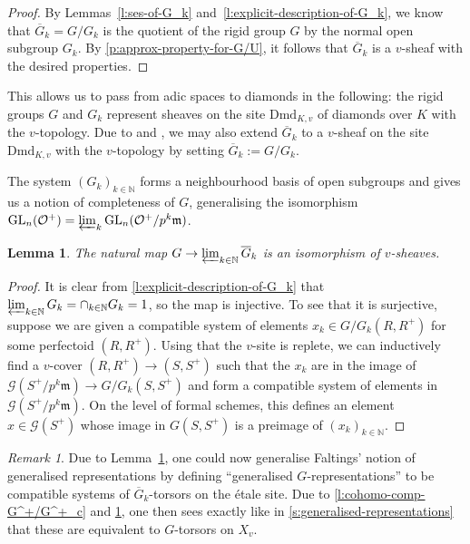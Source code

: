 \documentclass[10pt,a4paper]{article}
\newtheorem{Lemma}[thm]{Lemma}
\theoremstyle{definition}
\theoremstyle{remark}
\newtheorem{Remark}[thm]{Remark}
\newcommand{\N}{\mathbb{N}}
\renewcommand{\O}{\mathcal{O}}
\newcommand{\m}{\mathfrak{m}}
\newcommand{\GL}{\operatorname{GL}}
\newcommand{\mG}{\mathcal{G}}
\newcommand{\Dmd}{\mathrm{Dmd}}
\numberwithin{equation}{section}
\begin{document}
\begin{proof}
	By Lemmas~\ref{l:ses-of-G_k} and~\ref{l:explicit-description-of-G_k}, we know that $\overline G_k=G/G_k$ is the quotient of the rigid group $G$ by the normal open subgroup $G_k$. By \cref{p:approx-property-for-G/U}, it follows that $\overline G_k$ is a $v$-sheaf with the desired properties.
\end{proof}

This allows us to pass from adic spaces to diamonds in the following: the rigid groups $G$ and $G_k$ represent sheaves on the site $\Dmd_{K,v}$ of diamonds over $K$ with the $v$-topology.
Due to  and , we may also extend $\overline{G}_k$ to a $v$-sheaf on the site $\Dmd_{K,v}$ with the $v$-topology by setting $\overline{G}_k:=G/G_k$.

The system $(G_k)_{k\in \N}$ forms a neighbourhood basis of  open subgroups and gives us a notion of completeness of $G$, generalising the isomorphism $\GL_n(\O^+)=\varprojlim_k \GL_n(\O^+/p^k\m)$. 

\begin{Lemma}\label{l:G^+-complete}
	The natural map $ G\to\varprojlim_{k\in \N} \overline{G}_{k}$
	is an isomorphism of $v$-sheaves.
\end{Lemma}

\begin{proof}
	It is clear from \cref{l:explicit-description-of-G_k} that $\varprojlim_{k\in \N} G_k=\cap_{k\in \N} G_k=1$, so the map is injective. To see that it is surjective, suppose we are given a compatible system of elements $x_k\in G/G_k(R,R^+)$ for some perfectoid $(R,R^+)$. Using that the $v$-site is replete, we can inductively find a $v$-cover $(R,R^+)\to (S,S^+)$ such that the $x_k$ are in the image of $\mG(S^+/p^k\m)\to G/G_k(S,S^+)$ and form a compatible system of elements in $\mG(S^+/p^k\m)$. On the level of formal schemes, this defines an element $x\in\mG(S^+)$ whose image in $G(S,S^+)$ is a preimage of $(x_k)_{k\in \N}$.
\end{proof}

\begin{Remark}
	Due to Lemma~\ref{l:G^+-complete}, one could now generalise Faltings' notion of generalised representations by defining ``generalised $G$-representations'' to be compatible systems of $\overline G_{k}$-torsors on the \'etale site. Due to \cref{l:cohomo-comp-G^+/G^+_c} and \cref{l:G^+-complete}, one then sees exactly like in \cref{s:generalised-representations} that these are equivalent to $G$-torsors on $X_v$.
\end{Remark}
\end{document}
